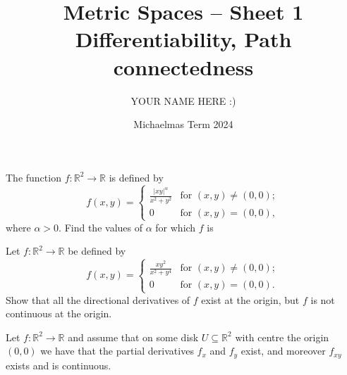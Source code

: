 \documentclass[answers]{exam}
\title{Metric Spaces -- Sheet 1\\Differentiability, Path connectedness}
\author{YOUR NAME HERE :)}
\date{Michaelmas Term 2024}
\begin{document}
\begin{questions}

\question%
The function $f:\mathbb R^2\to\mathbb R$ is defined by\[
	f(x,y)=\begin{cases}
		\frac{|xy|^\alpha}{x^2+y^2} & \text{for }(x,y)\neq(0,0);\\
		0 & \text{for }(x,y)=(0,0),
	\end{cases}
\] where $\alpha>0$. Find the values of $\alpha$ for which $f$ is



\question%
Let $f:\mathbb R^2\to\mathbb R$ be defined by \[
	f(x,y)=\begin{cases}
		\frac{xy^2}{x^2+y^4} & \text{for }(x,y)\neq(0,0);\\
		0 & \text{for }(x,y)=(0,0).
	\end{cases}
\] Show that all the directional derivatives of $f$ exist at the origin, but $f$ is not continuous at the origin.



\question%
Let $f:\mathbb R^2\to\mathbb R$ and assume that on some disk $U\subseteq\mathbb R^2$ with centre the origin $(0,0)$ we have that the partial derivatives $f_x$ and $f_y$ exist, and moreover $f_{x y}$ exists and is continuous.
\end{questions}
\end{document}
